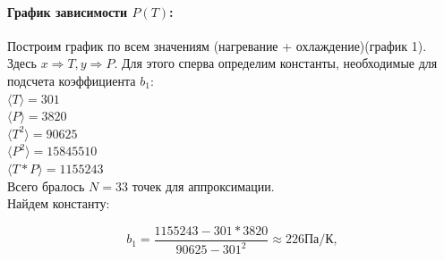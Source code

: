 \documentclass[a4paper,12pt]{article}
\begin{document}
\begin{enumerate}
\paragraph{График зависимости $P(T)$:}

Построим график по всем значениям (нагревание + охлаждение)(график 1). Здесь $x \Rightarrow T, y \Rightarrow P$. Для этого сперва определим константы, необходимые для подсчета коэффициента $b_1$:\\
$\langle T \rangle = 301$\\ 
$\langle P \rangle = 3820$\\
$\langle T^2 \rangle = 90625$\\
$\langle P^2 \rangle = 15845510$\\
$\langle T*P \rangle = 1155243$\\
Всего бралось $ N = 33$ точек для аппроксимации. \\
Найдем константу:

\[b_1 = \frac{1155243 - 301*3820}{90625-301^2} \approx 226 \text{Па/К},\]

\begin{figure}[h]
\label{plot_1}
\end{figure}

\end{enumerate}
\end{document}
